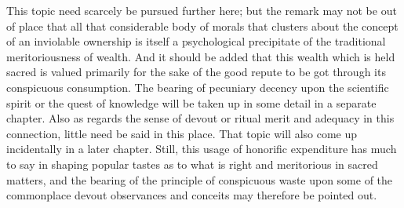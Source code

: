 \documentclass[12pt]{report}
\begin{document}
This topic need scarcely be pursued further here; but the remark may not
be out of place that all that considerable body of morals that clusters
about the concept of an inviolable ownership is itself a psychological
precipitate of the traditional meritoriousness of wealth. And it should
be added that this wealth which is held sacred is valued primarily
for the sake of the good repute to be got through its conspicuous
consumption. The bearing of pecuniary decency upon the scientific spirit
or the quest of knowledge will be taken up in some detail in a separate
chapter. Also as regards the sense of devout or ritual merit and
adequacy in this connection, little need be said in this place. That
topic will also come up incidentally in a later chapter. Still, this
usage of honorific expenditure has much to say in shaping popular tastes
as to what is right and meritorious in sacred matters, and the bearing
of the principle of conspicuous waste upon some of the commonplace
devout observances and conceits may therefore be pointed out.
\end{document}
